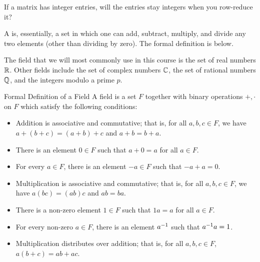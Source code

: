 \endedxproblem


If a matrix has integer entries, will the entries stay integers when you 
row-reduce it?  


\edXsolution{ 
}

\endedxproblem




\endedxvertical





A {} is, essentially, a set in which one can add, subtract, multiply, and
divide any two elements (other than dividing by zero).  The formal definition is below.  

The field that we will
most commonly use in this course is the set of real numbers $\mathbb R$.  Other fields include
the set of complex numbers $\mathbb C$, the set of rational numbers $\mathbb Q$, and the integers modulo
a prime $p$.  

\begin{edXshowhide}{Formal Definition of a Field}
A field is a set $F$ together with binary operations $+, \cdot$ on $F$ which satisfy the
following conditions:

\begin{itemize}
\item Addition is associative and commutative; that is, for all $a,b,c \in F$, we have
$a+(b+c) = (a+b)+c$ and $a+b  = b+a$.  
\item There is an element $0 \in F$ such that $a+0 = a$ for all $a \in F$.
\item For every $a\in F$, there is an element $-a \in F$ such that $-a + a = 0$.  
\item Multiplication is associative and commutative; that is, for all $a,b,c \in F$, we have
$a(bc) = (ab)c$ and $ab  = ba$.  
\item There is a non-zero element $1 \in F$ such that $1a = a$ for all $a \in F$.  
\item For every non-zero $a\in F$, there is an element $a^{-1}$ such that $a^{-1} a = 1$.  
\item Multiplication distributes over addition; that is, for all $a,b,c \in F$, $a(b+c) = ab + ac$.  
\end{itemize}

\end{edXshowhide}




\endedxtext

\endedxvertical


